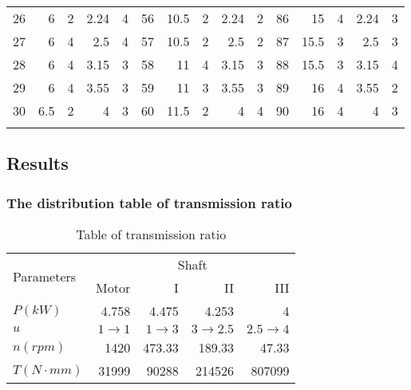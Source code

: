 \begin{center}
\begin{longtable}{C{0.6cm}rrrrC{0.6cm}rrrrC{0.6cm}rrrr}
		{}26&6&2&2.24&4&  {}56&10.5&2&2.24&2&{}86&15&4&2.24&3\\
		27&6&4&2.5&4&   {}57&10.5&2&2.5&2& {}87&15.5&3&2.5&3\\
		{}28&6&4&3.15&3&  {}58&11&4&3.15&3&  {}88&15.5&3&3.15&4\\
		29&6&4&3.55&3&  {}59&11&3&3.55&3&  {}89&16&4&3.55&2\\
		{}30&6.5&2&4&3&   {}60&11.5&2&4&4&   {}90&16&4&4&3\\
		\label{project}
	\end{longtable}
\end{center}

\subsection{Results}
\subsubsection{The distribution table of transmission ratio}
\begin{center}
	\begin{longtable}{lrrrr}
		\toprule
		\multirow{2}{*}{Parameters} & \multicolumn{4}{c}{Shaft}\\
		\cmidrule{2-5}  &Motor & I & II & III\\\midrule\endfirsthead
		\bottomrule\caption{Table of transmission ratio}\endlastfoot
		$ P\unit{(kW)} $ & 4.758 & 4.475 & 4.253 & 4\\
		$ u $ & $ 1\rightarrow1 $ & $ 1\rightarrow3 $ & $ 3\rightarrow2.5 $ & $ 2.5\rightarrow4 $\\
		$ n\unit{(rpm)} $ & 1420 & 473.33 & 189.33 & 47.33 \\
		$ T\unit{(N\cdot mm)} $ & 31999 & 90288 & 214526 & 807099
	\end{longtable}
\end{center}

